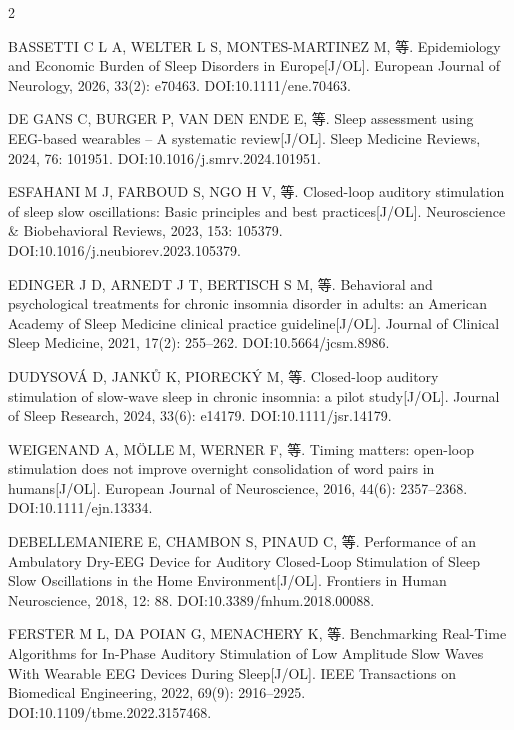 \documentclass[UTF8,zihao=5,fontset=none]{ctexart}
\newcommand{\song}{\CJKfamily{song}}
\newcommand{\hei}{\CJKfamily{hei}}
\begin{document}
\begin{multicols}{2}
\vspace{15.6pt}\noindent{\hei\fontsize{12pt}{15.6pt}\selectfont\bfseries 参考文献}\par\vspace{8pt}
{\song\fontsize{7.5pt}{9pt}\selectfont\setlength{\parindent}{0pt}\setlength{\parskip}{0pt}%
\sloppy
{}
\makebox[25.2pt][l]{[1]}BASSETTI C L A, WELTER L S, MONTES-MARTINEZ M, 等. Epidemiology and Economic Burden of Sleep Disorders in Europe[J/OL]. European Journal of Neurology, 2026, 33(2): e70463. DOI:10.1111/ene.70463.\par
\makebox[25.2pt][l]{[2]}DE GANS C, BURGER P, VAN DEN ENDE E, 等. Sleep assessment using EEG-based wearables – A systematic review[J/OL]. Sleep Medicine Reviews, 2024, 76: 101951. DOI:10.1016/j.smrv.2024.101951.\par
\makebox[25.2pt][l]{[3]}ESFAHANI M J, FARBOUD S, NGO H V, 等. Closed-loop auditory stimulation of sleep slow oscillations: Basic principles and best practices[J/OL]. Neuroscience \& Biobehavioral Reviews, 2023, 153: 105379. DOI:10.1016/j.neubiorev.2023.105379.\par
\makebox[25.2pt][l]{[4]}EDINGER J D, ARNEDT J T, BERTISCH S M, 等. Behavioral and psychological treatments for chronic insomnia disorder in adults: an American Academy of Sleep Medicine clinical practice guideline[J/OL]. Journal of Clinical Sleep Medicine, 2021, 17(2): 255--262. DOI:10.5664/jcsm.8986.\par
\makebox[25.2pt][l]{[5]}DUDYSOVÁ D, JANKŮ K, PIORECKÝ M, 等. Closed-loop auditory stimulation of slow-wave sleep in chronic insomnia: a pilot study[J/OL]. Journal of Sleep Research, 2024, 33(6): e14179. DOI:10.1111/jsr.14179.\par
\makebox[25.2pt][l]{[6]}WEIGENAND A, MÖLLE M, WERNER F, 等. Timing matters: open-loop stimulation does not improve overnight consolidation of word pairs in humans[J/OL]. European Journal of Neuroscience, 2016, 44(6): 2357--2368. DOI:10.1111/ejn.13334.\par
\makebox[25.2pt][l]{[7]}DEBELLEMANIERE E, CHAMBON S, PINAUD C, 等. Performance of an Ambulatory Dry-EEG Device for Auditory Closed-Loop Stimulation of Sleep Slow Oscillations in the Home Environment[J/OL]. Frontiers in Human Neuroscience, 2018, 12: 88. DOI:10.3389/fnhum.2018.00088.\par
\makebox[25.2pt][l]{[8]}FERSTER M L, DA POIAN G, MENACHERY K, 等. Benchmarking Real-Time Algorithms for In-Phase Auditory Stimulation of Low Amplitude Slow Waves With Wearable EEG Devices During Sleep[J/OL]. IEEE Transactions on Biomedical Engineering, 2022, 69(9): 2916--2925. DOI:10.1109/tbme.2022.3157468.\par
}
\end{multicols}
\end{document}
